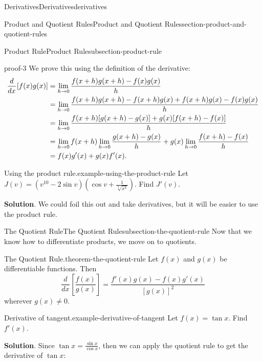 \documentclass[oneside,10pt,]{book}
\renewcommand{\qedhere}{\relax}
\numberwithin{equation}{section}
\newcommand{\dv}[3][]{\dfrac{d^{#1} #2}{d #3^{#1}}}
\begin{document}
\begin{chapterptx}{Derivatives}{}{Derivatives}{}{}{derivatives}
\begin{sectionptx}{Product and Quotient Rules}{}{Product and Quotient Rules}{}{}{section-product-and-quotient-rules}
\begin{subsectionptx}{Product Rule}{}{Product Rule}{}{}{subsection-product-rule}
\begin{proofptx}{}{proof-3}
\hypertarget{p-141}{}%
We prove this using the definition of the derivative:%
\begin{align*}
\dv{}{x}[f(x)g(x)] & = \lim_{h\to0}\frac{f(x+h)g(x+h) - f(x)g(x)}{h} \\
& = \lim_{h\to0}\frac{f(x+h)g(x+h) - f(x+h)g(x) + f(x+h)g(x) - f(x)g(x)}{h} \\
& = \lim_{h\to0}\frac{f(x+h)[g(x+h) - g(x)] + g(x)[f(x+h) - f(x)]}{h} \\
& = \lim_{h\to0}f(x+h)\lim_{h\to0}\frac{g(x+h) - g(x)}{h} + g(x)\lim_{h\to0}\frac{f(x+h) - f(x)}{h} \\
& = f(x)g'(x) + g(x)f'(x). \qedhere
\end{align*}
%
\end{proofptx}
\begin{example}{Using the product rule.}{example-using-the-product-rule}%
\hypertarget{p-142}{}%
Let \(J(v) = (v^{10} - 2\sin v)(\cos v + \frac{1}{\sqrt[3]{x^{4}}})\). Find \(J'(v)\).%
\par\smallskip%
\noindent\textbf{Solution}.\hypertarget{solution-28}{}\quad%
\hypertarget{p-143}{}%
We could foil this out and take derivatives, but it will be easier to use the product rule.%
\end{example}
\end{subsectionptx}
%
%
\typeout{************************************************}
\typeout{************************************************}
%
\begin{subsectionptx}{The Quotient Rule}{}{The Quotient Rule}{}{}{subsection-the-quotient-rule}
\hypertarget{p-144}{}%
Now that we know how to differentiate products, we move on to quotients.%
\begin{theorem}{The Quotient Rule.}{}{theorem-the-quotient-rule}%
\hypertarget{p-145}{}%
Let \(f(x)\) and \(g(x)\) be differentiable functions. Then%
\begin{equation*}
\dv{}{x}\left[\frac{f(x)}{g(x)}\right] = \frac{f'(x)g(x) - f(x)g'(x)}{[g(x)]^{2}}
\end{equation*}
wherever \(g(x)\neq0\).%
\end{theorem}
\begin{example}{Derivative of tangent.}{example-derivative-of-tangent}%
\hypertarget{p-146}{}%
Let \(f(x) = \tan x\). Find \(f'(x)\).%
\par\smallskip%
\noindent\textbf{Solution}.\hypertarget{solution-29}{}\quad%
\hypertarget{p-147}{}%
Since \(\tan x = \frac{\sin x}{\cos x}\), then we can apply the quotient rule to get the derivative of \(\tan x\):%

\end{example}
\end{subsectionptx}
\end{sectionptx}
\end{chapterptx}
\end{document}
